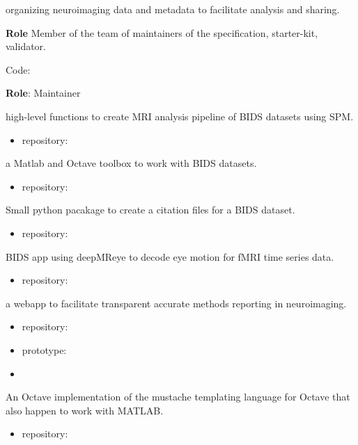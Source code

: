 
 organizing neuroimaging data and metadata to facilitate analysis and sharing.

\textbf{Role} Member of the team of maintainers of the specification, starter-kit, validator.

\textbullet Code: 

\vspace{5mm}


\textbf{Role}: Maintainer

 high-level functions to create MRI analysis pipeline of BIDS datasets using SPM.
\begin{itemize}
    \item repository: 
\end{itemize}
    
 a Matlab and Octave toolbox to work with BIDS datasets.
\begin{itemize}
    \item repository: 
\end{itemize}

 Small python pacakage to create a citation files for a BIDS dataset.
\begin{itemize}
    \item repository: 
\end{itemize}

 BIDS app using deepMReye to decode eye motion for fMRI time series data. 
\begin{itemize}
    \item repository: 
\end{itemize}

 a webapp to facilitate transparent accurate methods reporting in neuroimaging.
\begin{itemize}
    \item repository: 
    \item prototype: 
    \item {}
\end{itemize}

 An Octave implementation of the mustache templating language for Octave that also happen to work with MATLAB.  
\begin{itemize}
    \item repository: 
\end{itemize}

